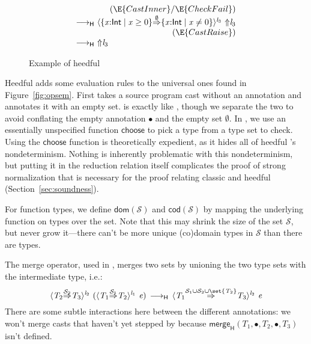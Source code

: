 \documentclass[9pt]{extarticle}
\newcommand{\ottnt}[1]{\mathit{#1}}
\newcommand{\ottsym}[1]{#1}
\begin{document}
{\begin{figure}[t]
\[\begin{array}{r@{~}l}
 \multicolumn{2}{r}{(\E{CastInner}/\E{CheckFail})} \\
  \longrightarrow _{  \mathsf{H}  }  &  \langle   \{ \mathit{x} \mathord{:}  \mathsf{Int}  \mathrel{\mid}  \mathit{x}  \mathrel{\ge}  \ottsym{0}  \}   \mathord{ \overset{ \emptyset }{\Rightarrow} }   \{ \mathit{x} \mathord{:}  \mathsf{Int}  \mathrel{\mid}  \mathit{x}  \mathrel{\ne}  \ottsym{0}  \}   \rangle^{ \ottnt{l_{{\mathrm{3}}}} } ~   \mathord{\Uparrow}  \ottnt{l_{{\mathrm{3}}}}  \\
 \multicolumn{2}{r}{(\E{CastRaise})} \\
  \longrightarrow _{  \mathsf{H}  }  &  \mathord{\Uparrow}  \ottnt{l_{{\mathrm{3}}}}  
\end{array} \]
\caption{Example of heedful \lambdah}
\label{fig:heedfulexample}
\end{figure}

Heedful \lambdah adds some evaluation rules to the universal ones
found in Figure~\ref{fig:opsem}.
First  takes a source program cast without an annotation
and annotates it with an empty set.
 is exactly like \ECheckNone, though we separate the
two to avoid conflating the empty annotation $ \bullet $ and the empty
set $ \emptyset $.
In , we use an essentially unspecified function
$ \mathsf{choose} $ to pick a type from a type set to check. Using the
$ \mathsf{choose} $ function is theoretically expedient, as it hides all of
heedful \lambdah's nondeterminism. Nothing is inherently problematic
with this nondeterminism, but putting it in the reduction relation
itself complicates the proof of strong normalization that is necessary
for the proof relating classic and heedful \lambdah (Section~\ref{sec:soundness}).

For function types, we define $ \mathsf{dom} ( \mathcal{S} ) $ and $ \mathsf{cod} ( \mathcal{S} ) $ by mapping
the underlying function on types over the set. Note that this may
shrink the size of the set $\mathcal{S}$, but never grow it---there can't be
more unique (co)domain types in $\mathcal{S}$ than there are types.

The merge operator, used in , merges two sets by unioning
the two type sets with the intermediate type, i.e.:
\[  \langle  \ottnt{T_{{\mathrm{2}}}}  \mathord{ \overset{ \mathcal{S}_{{\mathrm{2}}} }{\Rightarrow} }  \ottnt{T_{{\mathrm{3}}}}  \rangle^{ \ottnt{l_{{\mathrm{2}}}} } ~   (  \langle  \ottnt{T_{{\mathrm{1}}}}  \mathord{ \overset{ \mathcal{S}_{{\mathrm{1}}} }{\Rightarrow} }  \ottnt{T_{{\mathrm{2}}}}  \rangle^{ \ottnt{l_{{\mathrm{1}}}} } ~  \ottnt{e}  )   \,  \longrightarrow _{  \mathsf{H}  }  \,  \langle  \ottnt{T_{{\mathrm{1}}}}  \mathord{ \overset{   \mathcal{S}_{{\mathrm{1}}}  \cup  \mathcal{S}_{{\mathrm{2}}}   \cup   \set{  \ottnt{T_{{\mathrm{2}}}}  }   }{\Rightarrow} }  \ottnt{T_{{\mathrm{3}}}}  \rangle^{ \ottnt{l_{{\mathrm{2}}}} } ~  \ottnt{e}  \]
There are some subtle interactions here between the different
annotations: we won't merge casts that haven't yet stepped by
 because $ \mathsf{merge} _{  \mathsf{H}  }( \ottnt{T_{{\mathrm{1}}}} , \bullet , \ottnt{T_{{\mathrm{2}}}} , \bullet , \ottnt{T_{{\mathrm{3}}}} ) $ isn't
defined.

}
\end{document}
